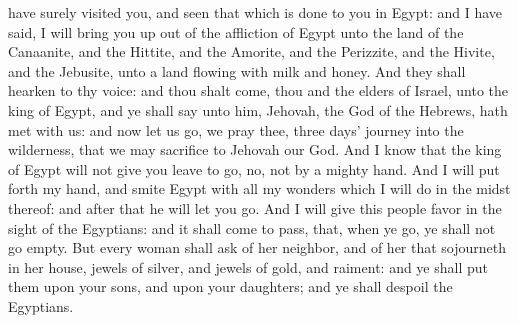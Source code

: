 have surely visited you, and seen that which is done to you in Egypt: and I have said, I will bring you up out of the affliction of Egypt unto the land of the Canaanite, and the Hittite, and the Amorite, and the Perizzite, and the Hivite, and the Jebusite, unto a land flowing with milk and honey. And they shall hearken to thy voice: and thou shalt come, thou and the elders of Israel, unto the king of Egypt, and ye shall say unto him, Jehovah, the God of the Hebrews, hath met with us: and now let us go, we pray thee, three days’ journey into the wilderness, that we may sacrifice to Jehovah our God. And I know that the king of Egypt will not give you leave to go, no, not by a mighty hand. And I will put forth my hand, and smite Egypt with all my wonders which I will do in the midst thereof: and after that he will let you go. And I will give this people favor in the sight of the Egyptians: and it shall come to pass, that, when ye go, ye shall not go empty. But every woman shall ask of her neighbor, and of her that sojourneth in her house, jewels of silver, and jewels of gold, and raiment: and ye shall put them upon your sons, and upon your daughters; and ye shall despoil the Egyptians. 

